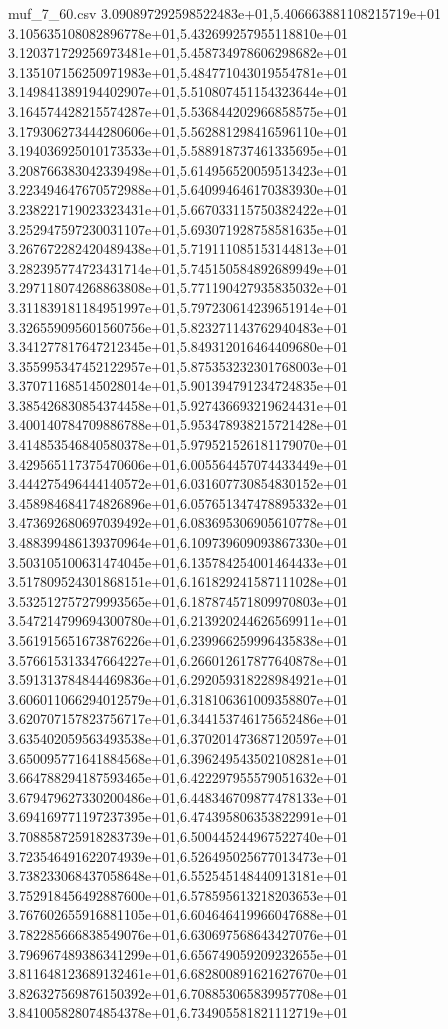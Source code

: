 \begin{filecontents*}{muf_7_60.csv}
3.090897292598522483e+01,5.406663881108215719e+01
3.105635108082896778e+01,5.432699257955118810e+01
3.120371729256973481e+01,5.458734978606298682e+01
3.135107156250971983e+01,5.484771043019554781e+01
3.149841389194402907e+01,5.510807451154323644e+01
3.164574428215574287e+01,5.536844202966858575e+01
3.179306273444280606e+01,5.562881298416596110e+01
3.194036925010173533e+01,5.588918737461335695e+01
3.208766383042339498e+01,5.614956520059513423e+01
3.223494647670572988e+01,5.640994646170383930e+01
3.238221719023323431e+01,5.667033115750382422e+01
3.252947597230031107e+01,5.693071928758581635e+01
3.267672282420489438e+01,5.719111085153144813e+01
3.282395774723431714e+01,5.745150584892689949e+01
3.297118074268863808e+01,5.771190427935835032e+01
3.311839181184951997e+01,5.797230614239651914e+01
3.326559095601560756e+01,5.823271143762940483e+01
3.341277817647212345e+01,5.849312016464409680e+01
3.355995347452122957e+01,5.875353232301768003e+01
3.370711685145028014e+01,5.901394791234724835e+01
3.385426830854374458e+01,5.927436693219624431e+01
3.400140784709886788e+01,5.953478938215721428e+01
3.414853546840580378e+01,5.979521526181179070e+01
3.429565117375470606e+01,6.005564457074433449e+01
3.444275496444140572e+01,6.031607730854830152e+01
3.458984684174826896e+01,6.057651347478895332e+01
3.473692680697039492e+01,6.083695306905610778e+01
3.488399486139370964e+01,6.109739609093867330e+01
3.503105100631474045e+01,6.135784254001464433e+01
3.517809524301868151e+01,6.161829241587111028e+01
3.532512757279993565e+01,6.187874571809970803e+01
3.547214799694300780e+01,6.213920244626569911e+01
3.561915651673876226e+01,6.239966259996435838e+01
3.576615313347664227e+01,6.266012617877640878e+01
3.591313784844469836e+01,6.292059318228984921e+01
3.606011066294012579e+01,6.318106361009358807e+01
3.620707157823756717e+01,6.344153746175652486e+01
3.635402059563493538e+01,6.370201473687120597e+01
3.650095771641884568e+01,6.396249543502108281e+01
3.664788294187593465e+01,6.422297955579051632e+01
3.679479627330200486e+01,6.448346709877478133e+01
3.694169771197237395e+01,6.474395806353822991e+01
3.708858725918283739e+01,6.500445244967522740e+01
3.723546491622074939e+01,6.526495025677013473e+01
3.738233068437058648e+01,6.552545148440913181e+01
3.752918456492887600e+01,6.578595613218203653e+01
3.767602655916881105e+01,6.604646419966047688e+01
3.782285666838549076e+01,6.630697568643427076e+01
3.796967489386341299e+01,6.656749059209232655e+01
3.811648123689132461e+01,6.682800891621627670e+01
3.826327569876150392e+01,6.708853065839957708e+01
3.841005828074854378e+01,6.734905581821112719e+01

\end{filecontents*}
